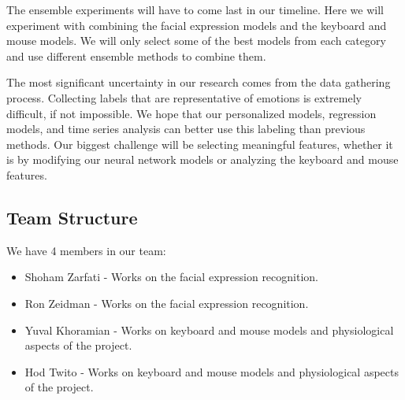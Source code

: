 \documentclass[../main.tex]{subfiles}
\begin{document}
The ensemble experiments will have to come last in our timeline. Here we will experiment with combining the facial expression models and the
keyboard and mouse models. We will only select some of the best models from each category and use different ensemble methods to combine them.
\par

The most significant uncertainty in our research comes from the data gathering process. Collecting labels that are representative of emotions
is extremely difficult, if not impossible. We hope that our personalized models, regression models, and time series analysis can better use this
labeling than previous methods. Our biggest challenge will be selecting meaningful features, whether it is by modifying our neural network models
or analyzing the keyboard and mouse features.


\subsection{Team Structure}
 
We have 4 members in our team:
\begin{itemize}
    \item Shoham Zarfati - Works on the facial expression recognition.
    \item Ron Zeidman - Works on the facial expression recognition.
    \item Yuval Khoramian - Works on keyboard and mouse models and physiological aspects of the project.
    \item Hod Twito - Works on keyboard and mouse models and physiological aspects of the project.
\end{itemize}
 
\end{document}
